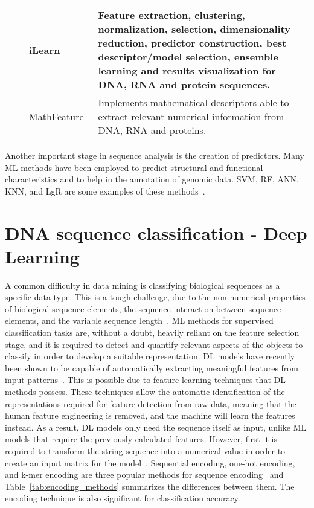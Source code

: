 \begin{table}[ht]
\begin{tabular}{lp{2cm}p{3.5cm}p{7cm}}
	\citeyear{Chen2019ILearn:Data} & \citeauthor{Chen2019ILearn:Data} & iLearn~\cite{Chen2019ILearn:Data} & Feature extraction, clustering, normalization, selection, dimensionality reduction, predictor construction, best descriptor/model selection, ensemble learning and results visualization for \gls{DNA}, \gls{RNA} and protein sequences.\\\midrule
	
	\citeyear{Bonidia2021MathFeature:Descriptors} & \citeauthor{Bonidia2021MathFeature:Descriptors} & MathFeature~\cite{Bonidia2021MathFeature:Descriptors} & Implements mathematical descriptors able to extract relevant numerical information from \gls{DNA}, \gls{RNA} and proteins.\\
    
	\bottomrule
\end{tabular}
\end{table}

Another important stage in sequence analysis is the creation of predictors. Many \gls{ML} methods have been employed to predict structural and functional characteristics and to help in the annotation of genomic data. \gls{SVM}, \gls{RF}, \gls{ANN}, \gls{KNN}, and \gls{LgR} are some examples of these methods~\cite{Chen2019ILearn:Data}.



\section{DNA sequence classification - Deep Learning}\label{sec:dna-dl}

A common difficulty in data mining is classifying biological sequences as a specific data type. This is a tough challenge, due to the non-numerical properties of biological sequence elements, the sequence interaction between sequence elements, and the variable sequence length~\cite{Yang2020ReviewDNA}. \gls{ML} methods for supervised classification tasks are, without a doubt, heavily reliant on the feature selection stage, and it is required to detect and quantify relevant aspects of the objects to classify in order to develop a suitable representation. \gls{DL} models have recently been shown to be capable of automatically extracting meaningful features from input patterns~\cite{LoBosco2017DeepClassification}. This is possible due to feature learning techniques that \gls{DL} methods possess. These techniques allow the automatic identification of the representations required for feature detection from raw data, meaning that the human feature engineering is removed, and the machine will learn the features instead. As a result, \gls{DL} models only need the sequence itself as input, unlike \gls{ML} models that require the previously calculated features. However, first it is required to transform the string sequence into a numerical value in order to create an input matrix for the model~\cite{Yang2020ReviewDNA}. Sequential encoding, one-hot encoding, and k-mer encoding are three popular methods for sequence encoding~\cite{Choong2017EvaluationMethod} and Table~\ref{tab:encoding_methods} summarizes the differences between them. The encoding technique is also significant for classification accuracy.

